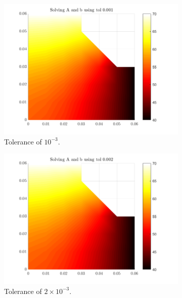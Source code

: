 \documentclass[12pt,a4paper]{article}
\begin{document}
\begin{figure}
\begin{subfigure}[b]{0.4\textwidth}
		\label{fig:tole-05}
	\end{subfigure}
	\hfill
	\begin{subfigure}[b]{0.4\textwidth}
		\centering
		\includegraphics[width=\linewidth]{images/Comparisontol0-001.png}
		\caption{Tolerance of $10^{-3}$.}
		\label{fig:tol0.001}
	\end{subfigure}
	\hfill
	\begin{subfigure}[b]{0.4\textwidth}
		\centering
		\includegraphics[width=\linewidth]{images/Comparisontol0-002.png}
		\caption{Tolerance of $2 \times 10^{-3}$.}
		\label{fig:tol0.002}
	\end{subfigure}
	\hfill
	\begin{subfigure}[b]{0.4\textwidth}

\end{subfigure}
\end{figure}
\end{document}
